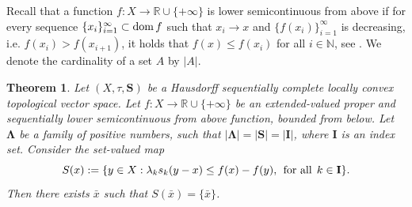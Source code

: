 \documentclass{article}
\def\dom{\mathop{\rm dom}}
\def\dom{\mathop{\rm dom}}
\def\dom{\mathop{\rm dom}}
\def\text#1{\,\;\hbox{#1}\;\,}
\newcommand{\N}{\mathbb{N}}
\newcommand{\R}{\mathbb{R}}
\newtheorem{theo}{Theorem}[section]
\begin{document}
Recall that a function $f: X \to \mathbb{R} \cup \{ + \infty \}$ is lower semicontinuous from above if for every sequence $\{x_i\}_{i=1}^\infty \subset \dom f$ such that $x_i \to x $ and $\{f(x_i)\}_{i=1}^\infty$ is decreasing, i.e. $f(x_i)>f(x_{i+1})$, it holds that $f(x) \leq f(x_i)$ for all $i \in \N$, see \cite{KS}. We denote the cardinality of a set $A$ by $|A|$.
\begin{theo} \label{Ek_loc_conv}
Let $(X,\tau, \mathbf{S})$ be a Hausdorff sequentially complete locally convex topological
 vector space. Let $f: X \rightarrow \R \cup \{+\infty\}$ be an extended-valued proper and sequentially lower semicontinuous from above function, bounded from below. Let $\mathbf{\Lambda}$ be a family of positive numbers, such that $|\mathbf{\Lambda}|=|\mathbf{S}|=|\mathbf{I}|$, where $\mathbf{I}$ is an index set. Consider the set-valued map
\begin{equation} \label{Ekeland_map}
S(x):=\{y \in X: \lambda_k s_k(y-x) \leq f(x)-f(y), \text{for all} k \in \mathbf{I}\}.
\end{equation}
Then there exists $\bar{x}$ such that $S(\bar{x})=\{\bar{x}\}$.
\end{theo}
\end{document}
